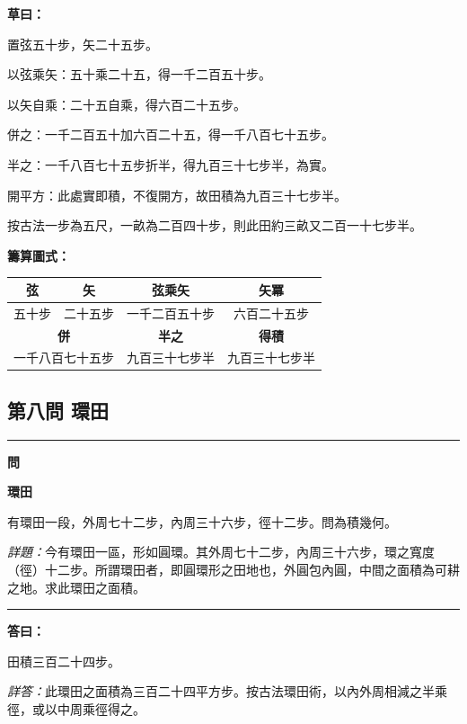 \documentclass[11pt,a4paper]{article}
\newenvironment{problem}[1][]{%
  \medskip\noindent\rule{\textwidth}{0.4pt}%
  \par\noindent\textbf{\color{sectioncolor}#1}\par\nopagebreak%
  \smallskip%
}{%
  \par\noindent\rule{\textwidth}{0.4pt}\medskip%
}
\newenvironment{answer}{%
  \medskip\noindent{\color{answercolor}\rule{0.5\textwidth}{0.5pt}}%
  \par\color{answercolor}%
}{%
  \par\medskip%
}
\newenvironment{calculation}{%
  \medskip\noindent{\color{caocolor}\rule{0.4\textwidth}{0.4pt}}%
  \par\color{caocolor}%
}{%
  \par\medskip%
}
\begin{document}
\begin{calculation}
\textbf{草曰：}

置弦五十步，矢二十五步。

以弦乘矢：五十乘二十五，得一千二百五十步。

以矢自乘：二十五自乘，得六百二十五步。

併之：一千二百五十加六百二十五，得一千八百七十五步。

半之：一千八百七十五步折半，得九百三十七步半，為實。

開平方：此處實即積，不復開方，故田積為九百三十七步半。

按古法一步為五尺，一畝為二百四十步，則此田約三畝又二百一十七步半。
\end{calculation}

\noindent\textbf{籌算圖式：}
\begin{center}
\begin{tabular}{|c|c|c|c|}
\hline
\textbf{弦} & \textbf{矢} & \textbf{弦乘矢} & \textbf{矢冪} \\
\hline
五十步 & 二十五步 & 一千二百五十步 & 六百二十五步 \\
\hline
\multicolumn{2}{|c|}{\textbf{併}} & \textbf{半之} & \textbf{得積} \\
\hline
\multicolumn{2}{|c|}{一千八百七十五步} & 九百三十七步半 & 九百三十七步半 \\
\hline
\end{tabular}
\end{center}

\subsection*{第八問 環田}

\begin{problem}[\textbf{問}]
\textbf{\color{sectioncolor}環田}

有環田一段，外周七十二步，內周三十六步，徑十二步。問為積幾何。

\medskip
\textit{詳題：}今有環田一區，形如圓環。其外周七十二步，內周三十六步，環之寬度（徑）十二步。所謂環田者，即圓環形之田地也，外圓包內圓，中間之面積為可耕之地。求此環田之面積。
\end{problem}

\begin{answer}
\textbf{答曰：}

田積三百二十四步。

\medskip
\textit{詳答：}此環田之面積為三百二十四平方步。按古法環田術，以內外周相減之半乘徑，或以中周乘徑得之。
\end{answer}
\end{document}
